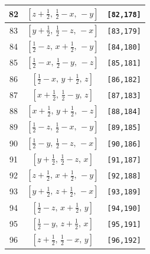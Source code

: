 \documentclass[fleqn,8pt]{jsarticle}
\begin{document}
\begin{longtable}{ccc}
82 & $\left[ z + \frac{1}{2},\, \frac{1}{2} - x,\, - y \right]$ & {\tt [82,178]} \\ \hline
83 & $\left[ y + \frac{1}{2},\, \frac{1}{2} - z,\, - x \right]$ & {\tt [83,179]} \\ \hline
84 & $\left[ \frac{1}{2} - z,\, x + \frac{1}{2},\, - y \right]$ & {\tt [84,180]} \\ \hline
85 & $\left[ \frac{1}{2} - x,\, \frac{1}{2} - y,\, - z \right]$ & {\tt [85,181]} \\ \hline
86 & $\left[ \frac{1}{2} - x,\, y + \frac{1}{2},\, z \right]$ & {\tt [86,182]} \\ \hline
87 & $\left[ x + \frac{1}{2},\, \frac{1}{2} - y,\, z \right]$ & {\tt [87,183]} \\ \hline
88 & $\left[ x + \frac{1}{2},\, y + \frac{1}{2},\, - z \right]$ & {\tt [88,184]} \\ \hline
89 & $\left[ \frac{1}{2} - z,\, \frac{1}{2} - x,\, - y \right]$ & {\tt [89,185]} \\ \hline
90 & $\left[ \frac{1}{2} - y,\, \frac{1}{2} - z,\, - x \right]$ & {\tt [90,186]} \\ \hline
91 & $\left[ y + \frac{1}{2},\, \frac{1}{2} - z,\, x \right]$ & {\tt [91,187]} \\ \hline
92 & $\left[ z + \frac{1}{2},\, x + \frac{1}{2},\, - y \right]$ & {\tt [92,188]} \\ \hline
93 & $\left[ y + \frac{1}{2},\, z + \frac{1}{2},\, - x \right]$ & {\tt [93,189]} \\ \hline
94 & $\left[ \frac{1}{2} - z,\, x + \frac{1}{2},\, y \right]$ & {\tt [94,190]} \\ \hline
95 & $\left[ \frac{1}{2} - y,\, z + \frac{1}{2},\, x \right]$ & {\tt [95,191]} \\ \hline
96 & $\left[ z + \frac{1}{2},\, \frac{1}{2} - x,\, y \right]$ & {\tt [96,192]} \\
\end{longtable}
\end{document}
